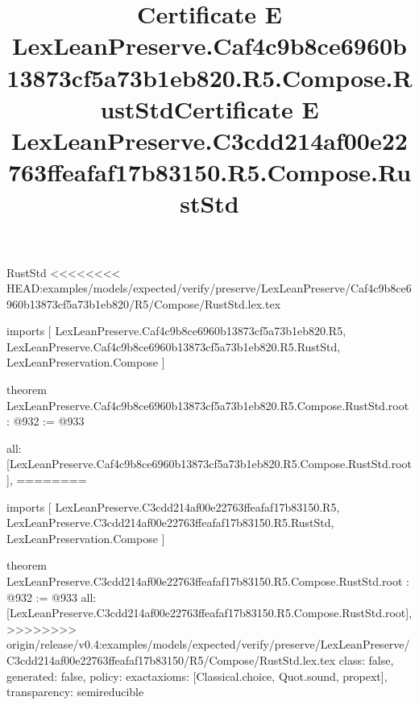 \begin{lexlean}{RustStd}
<<<<<<<< HEAD:examples/models/expected/verify/preserve/LexLeanPreserve/Caf4c9b8ce6960b13873cf5a73b1eb820/R5/Compose/RustStd.lex.tex
\title{Certificate E LexLeanPreserve.Caf4c9b8ce6960b13873cf5a73b1eb820.R5.Compose.RustStd}
\begin{coremodule}
imports [
  LexLeanPreserve.Caf4c9b8ce6960b13873cf5a73b1eb820.R5,
  LexLeanPreserve.Caf4c9b8ce6960b13873cf5a73b1eb820.R5.RustStd,
  LexLeanPreservation.Compose
]

theorem LexLeanPreserve.Caf4c9b8ce6960b13873cf5a73b1eb820.R5.Compose.RustStd.root : @932 := @933 {
  all: [LexLeanPreserve.Caf4c9b8ce6960b13873cf5a73b1eb820.R5.Compose.RustStd.root],
========
\title{Certificate E LexLeanPreserve.C3cdd214af00e22763ffeafaf17b83150.R5.Compose.RustStd}
\begin{coremodule}
imports [
  LexLeanPreserve.C3cdd214af00e22763ffeafaf17b83150.R5,
  LexLeanPreserve.C3cdd214af00e22763ffeafaf17b83150.R5.RustStd,
  LexLeanPreservation.Compose
]

theorem LexLeanPreserve.C3cdd214af00e22763ffeafaf17b83150.R5.Compose.RustStd.root : @932 := @933 {
  all: [LexLeanPreserve.C3cdd214af00e22763ffeafaf17b83150.R5.Compose.RustStd.root],
>>>>>>>> origin/release/v0.4:examples/models/expected/verify/preserve/LexLeanPreserve/C3cdd214af00e22763ffeafaf17b83150/R5/Compose/RustStd.lex.tex
  class: false,
  generated: false,
  policy: exact{axioms: [Classical.choice, Quot.sound, propext]},
  transparency: semireducible
}


\end{coremodule}}
\end{coremodule}
\end{lexlean}
